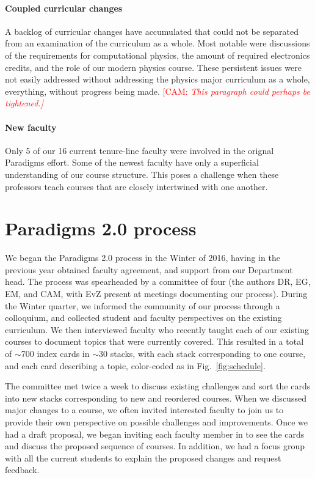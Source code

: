 \documentclass[english,aps,pra,reprint,noshowpacs,superscriptaddress]{revtex4-1}
\newcommand\corinnesays[1]{\textcolor{red}{[\sc CAM: \em{#1}]}}
\begin{document}
\paragraph{Coupled curricular changes}
A backlog of curricular changes have accumulated that could not be
separated from an examination of the curriculum as a whole.  Most
notable were discussions of the requirements for computational
physics, the amount of required electronics credits, and the role of
our modern physics course.  These persistent issues were not easily
addressed without addressing the physics major curriculum as a whole,
everything, without progress being made.  
\corinnesays{This paragraph could perhaps be tightened.}

\paragraph{New faculty}

Only 5 of our 16 current tenure-line faculty were involved in the
orignal Paradigms effort.  Some of the newest faculty have only a
superficial understanding of our course structure.  This poses a
challenge when these professors teach courses that are closely
intertwined with one another.

\section{Paradigms 2.0 process}
We began the Paradigms 2.0 process in the Winter of 2016, having in
the previous year obtained faculty agreement, and support from our
Department head.  The process was spearheaded by a committee of four
(the authors DR, EG, EM, and CAM, with EvZ present at meetings
documenting our process).  During the Winter quarter, we informed the
community of our process through a colloquium, and collected student
and faculty perspectives on the existing curriculum.  We then
interviewed faculty who recently taught each of our existing courses
to document topics that were currently covered.  This resulted in a
total of $\sim$700 index cards in $\sim$30 stacks, with each stack
corresponding to one course, and each card describing a topic,
color-coded as in Fig.~\ref{fig:schedule}.

The committee met twice a week to discuss existing challenges and sort
the cards into new stacks corresponding to new and reordered courses.
When we discussed major changes to a course, we often invited
interested faculty to join us to provide their own perspective on
possible challenges and improvements.  Once we had a draft proposal,
we began inviting each faculty member in to see the cards and discuss
the proposed sequence of courses.  In addition, we had a focus group with
all the current students to explain the proposed changes and request
feedback.
\end{document}
